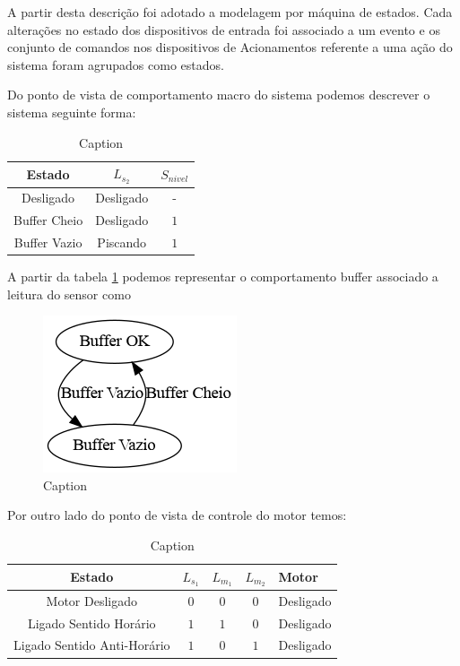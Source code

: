 \documentclass[a4paper,11pt]{article}
\begin{document}
A partir desta descrição foi adotado a modelagem por máquina de estados. Cada alterações no estado dos dispositivos de entrada foi associado a um evento e os conjunto de comandos nos dispositivos de Acionamentos referente a uma ação do sistema foram agrupados como estados.

Do ponto de vista de comportamento macro do sistema podemos descrever o sistema seguinte forma:

\begin{table}[H]
    \centering
    \begin{tabular}{c|cc}
        \hline
        Estado & $L_{s_2}$ & $S_{nivel}$ \\
        \hline
        Desligado & Desligado & - \\
        Buffer Cheio & Desligado & $1$\\
        Buffer Vazio & Piscando & $1$\\
        \hline
    \end{tabular}
    \caption{Caption}
    \label{tab:states_buffer}
\end{table}

A partir da tabela \ref{tab:states_buffer} podemos representar o comportamento buffer associado a leitura do sensor como

\begin{figure}[H]
    \centering
    \includegraphics[width=0.6\linewidth]{src/tex/img/automato_buffer.png}
    \caption{Caption}
    \label{fig:automato_buffer}
\end{figure}

Por outro lado do ponto de vista de controle do motor temos:

\begin{table}[H]
    \centering
    \begin{tabular}{c|cccl}
        \hline
        Estado & $L_{s_1}$ & $L_{m_1}$ & $L_{m_2}$ & Motor \\
        \hline
        Motor Desligado & $0$ & $0$ & $0$ & Desligado\\
        Ligado Sentido Horário & $1$ & $1$ & $0$ & Desligado\\
        Ligado Sentido Anti-Horário & $1$ & $0$ & $1$ & Desligado\\
    \end{tabular}
    \caption{Caption}
    \label{tab:states_motor}
\end{table}
\end{document}
